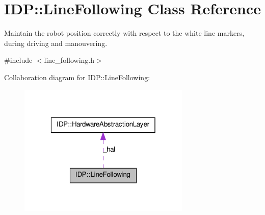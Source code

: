 \hypertarget{classIDP_1_1LineFollowing}{
\section{IDP::LineFollowing Class Reference}
\label{classIDP_1_1LineFollowing}
}


Maintain the robot position correctly with respect to the white line markers, during driving and manouvering.  




{\ttfamily \#include $<$line\_\-following.h$>$}



Collaboration diagram for IDP::LineFollowing:\nopagebreak
\begin{figure}[H]
\begin{center}
\leavevmode
\includegraphics[width=232pt]{classIDP_1_1LineFollowing__coll__graph}
\end{center}
\end{figure}
